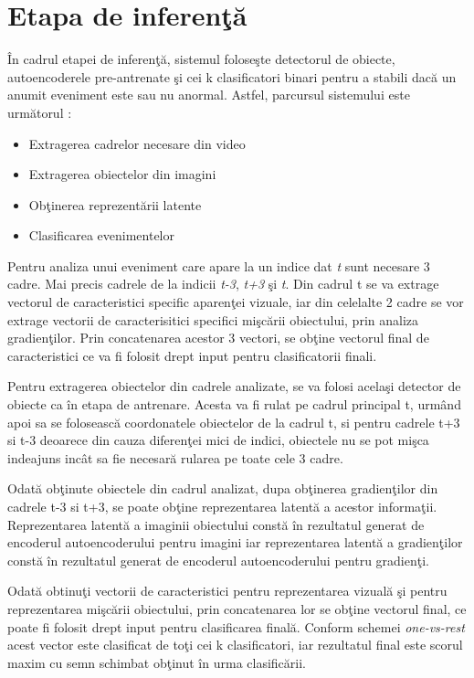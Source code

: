 \documentclass[a4paper,12pt]{report}
\begin{document}
\section{Etapa de inferenţă}
\quad În cadrul etapei de inferenţă, sistemul foloseşte detectorul de obiecte, autoencoderele pre-antrenate şi cei k clasificatori binari pentru a stabili dacă un anumit eveniment este sau nu anormal. Astfel, parcursul sistemului este următorul :
\begin{itemize}
\item Extragerea cadrelor necesare din video
\item Extragerea obiectelor din imagini
\item Obţinerea reprezentării latente
\item Clasificarea evenimentelor
\end{itemize}
\par
Pentru analiza unui eveniment care apare la un indice dat \emph{t} sunt necesare 3 cadre. Mai precis cadrele de la indicii \emph{t-3}, \emph{t+3} şi \emph{t}.
Din cadrul t se va extrage vectorul de caracteristici specific aparenţei vizuale, iar din celelalte 2 cadre se vor extrage vectorii de caracterisitici specifici mişcării obiectului, prin analiza gradienţilor. Prin concatenarea acestor 3 vectori, se obţine vectorul final de caracteristici ce va fi folosit drept input pentru clasificatorii finali.
\par
Pentru extragerea obiectelor din cadrele analizate, se va folosi acelaşi detector de obiecte ca în etapa de antrenare.  Acesta va fi rulat pe cadrul principal t, urmând apoi sa se folosească coordonatele obiectelor de la cadrul t, si pentru cadrele t+3 si t-3 deoarece din cauza diferenţei mici de indici, obiectele nu se pot mişca indeajuns incât sa fie necesară rularea pe toate cele 3 cadre.
\par
Odată obţinute obiectele din cadrul analizat, dupa obţinerea gradienţilor din cadrele t-3 si t+3, se poate obţine reprezentarea latentă a acestor informaţii.
Reprezentarea latentă a imaginii obiectului constă în rezultatul generat de encoderul autoencoderului pentru imagini iar reprezentarea latentă a gradienţilor constă în rezultatul generat de encoderul autoencoderului pentru gradienţi.
\par
Odată obtinuţi vectorii de caracteristici pentru reprezentarea vizuală şi pentru reprezentarea mişcării obiectului, prin concatenarea lor se obţine vectorul final, ce poate fi folosit drept input pentru clasificarea finală. Conform schemei \emph{one-vs-rest} acest vector este clasificat de toţi cei k clasificatori, iar rezultatul final este scorul maxim cu semn schimbat obţinut în urma clasificării.
\end{document}

